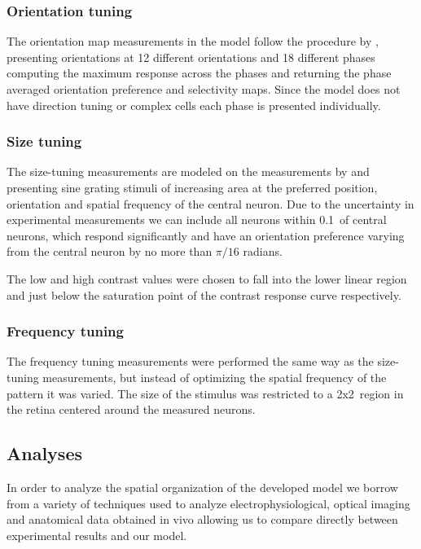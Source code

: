 \subsubsection{Orientation tuning} \label{ORMeasurement}

The orientation map measurements in the model follow the procedure by
\cite{Blasdel1992}, presenting orientations at 12 different
orientations and 18 different phases computing the maximum response
across the phases and returning the phase averaged orientation
preference and selectivity maps. Since the model does not have
direction tuning or complex cells each phase is presented
individually.

\subsubsection{Size tuning}

The size-tuning measurements are modeled on the measurements by
\cite{Sceniak1999} and \cite{Sceniak2001} presenting sine grating
stimuli of increasing area at the preferred position, orientation and
spatial frequency of the central neuron. Due to the uncertainty in
experimental measurements we can include all neurons within
0.1\degree\ of central neurons, which respond significantly and have
an orientation preference varying from the central neuron by no more
than $\pi/16$ radians.

The low and high contrast values were chosen to fall into the lower
linear region and just below the saturation point of the contrast
response curve respectively.

\subsubsection{Frequency tuning}

The frequency tuning measurements were performed the same way as the
size-tuning measurements, but instead of optimizing the spatial
frequency of the pattern it was varied. The size of the stimulus was
restricted to a 2x2\degree\ region in the retina centered around the
measured neurons.

\subsection{Analyses}

In order to analyze the spatial organization of the developed model we
borrow from a variety of techniques used to analyze
electrophysiological, optical imaging and anatomical data obtained in
vivo allowing us to compare directly between experimental results and
our model.

